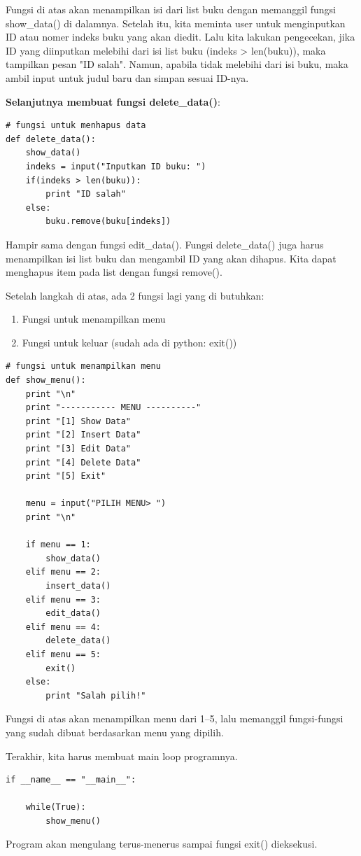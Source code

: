 Fungsi di atas akan menampilkan isi dari list buku dengan memanggil fungsi show\_data() di dalamnya. Setelah itu, kita meminta user untuk menginputkan ID atau nomer indeks buku yang akan diedit. Lalu kita lakukan pengecekan, jika ID yang diinputkan melebihi dari isi list buku (indeks > len(buku)), maka tampilkan pesan "ID salah". Namun, apabila tidak melebihi dari isi buku, maka ambil input untuk judul baru dan simpan sesuai ID-nya.
\par \textbf{Selanjutnya membuat fungsi delete\_data()}:
\begin{lstlisting}
# fungsi untuk menhapus data
def delete_data():
    show_data()
    indeks = input("Inputkan ID buku: ")
    if(indeks > len(buku)):
        print "ID salah"
    else:
        buku.remove(buku[indeks])
\end{lstlisting}
Hampir sama dengan fungsi edit\_data(). Fungsi delete\_data() juga harus menampilkan isi list buku dan mengambil ID yang akan dihapus. Kita dapat menghapus item pada list dengan fungsi remove().
 \par Setelah langkah di atas, ada 2 fungsi lagi yang di butuhkan:
 \begin{enumerate}
     \item Fungsi untuk menampilkan menu
     \item Fungsi untuk keluar (sudah ada di python: exit())
 \end{enumerate}
 \begin{lstlisting}
# fungsi untuk menampilkan menu
def show_menu():
    print "\n"
    print "----------- MENU ----------"
    print "[1] Show Data"
    print "[2] Insert Data"
    print "[3] Edit Data"
    print "[4] Delete Data"
    print "[5] Exit"
    
    menu = input("PILIH MENU> ")
    print "\n"

    if menu == 1:
        show_data()
    elif menu == 2:
        insert_data()
    elif menu == 3:
        edit_data()
    elif menu == 4:
        delete_data()
    elif menu == 5:
        exit()
    else:
        print "Salah pilih!"
\end{lstlisting}
Fungsi di atas akan menampilkan menu dari 1–5, lalu memanggil fungsi-fungsi yang sudah dibuat berdasarkan menu yang dipilih.

Terakhir, kita harus membuat main loop programnya.
\begin{lstlisting}
if __name__ == "__main__":
   
    while(True):
        show_menu()
\end{lstlisting}
Program akan mengulang terus-menerus sampai fungsi exit() dieksekusi.

